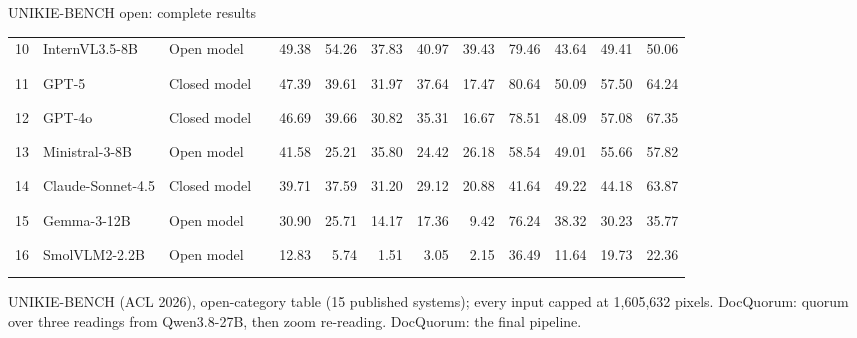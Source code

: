 \documentclass[aspectratio=169,10pt]{beamer}
\newcommand{\src}[1]{\par\vfill{\tiny\color{muted}#1\par}}
\begin{document}
\begin{frame}{UNIKIE-BENCH open: complete results}
\begin{tabularx}{\textwidth}{@{}rYl@{\hspace{6pt}}lrrrrrrrrr@{}}
10 & InternVL3.5-8B & {\color{good}Open model} & \textcolor{good!45}{\rule{0.59cm}{1.05ex}} & 49.38 & 54.26 & 37.83 & 40.97 & 39.43 & 79.46 & 43.64 & 49.41 & 50.06\\
11 & GPT-5 & {\color{muted}Closed model} & \textcolor{muted!45}{\rule{0.57cm}{1.05ex}} & 47.39 & 39.61 & 31.97 & 37.64 & 17.47 & 80.64 & 50.09 & 57.50 & 64.24\\
12 & GPT-4o & {\color{muted}Closed model} & \textcolor{muted!45}{\rule{0.56cm}{1.05ex}} & 46.69 & 39.66 & 30.82 & 35.31 & 16.67 & 78.51 & 48.09 & 57.08 & 67.35\\
13 & Ministral-3-8B & {\color{good}Open model} & \textcolor{good!45}{\rule{0.50cm}{1.05ex}} & 41.58 & 25.21 & 35.80 & 24.42 & 26.18 & 58.54 & 49.01 & 55.66 & 57.82\\
14 & Claude-Sonnet-4.5 & {\color{muted}Closed model} & \textcolor{muted!45}{\rule{0.48cm}{1.05ex}} & 39.71 & 37.59 & 31.20 & 29.12 & 20.88 & 41.64 & 49.22 & 44.18 & 63.87\\
15 & Gemma-3-12B & {\color{good}Open model} & \textcolor{good!45}{\rule{0.37cm}{1.05ex}} & 30.90 & 25.71 & 14.17 & 17.36 & 9.42 & 76.24 & 38.32 & 30.23 & 35.77\\
16 & SmolVLM2-2.2B & {\color{good}Open model} & \textcolor{good!45}{\rule{0.15cm}{1.05ex}} & 12.83 & 5.74 & 1.51 & 3.05 & 2.15 & 36.49 & 11.64 & 19.73 & 22.36\\
\bottomrule\end{tabularx}\endgroup

\src{UNIKIE-BENCH (ACL 2026), open-category table (15 published systems); every input capped at 1,605,632 pixels. DocQuorum: quorum over three readings from Qwen3.8-27B, then zoom re-reading. DocQuorum: the final pipeline.}
\end{frame}
\end{document}
